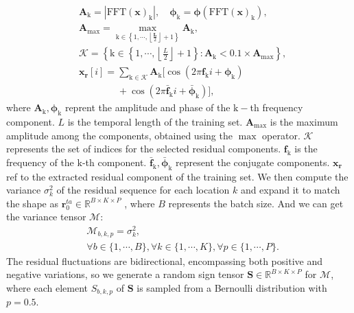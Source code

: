 \begin{equation}
    \begin{aligned}
    & \mathbf{A}_{\mathrm{k}} = \left| \text{FFT}(\mathbf{x})_\mathrm{k} \right|, \quad \mathbf{{\phi}}_{\mathrm{k}} = \mathbf{\phi} \left( \text{FFT}(\mathbf{x})_\mathrm{k} \right), \\
    & \mathbf{A}_{\text{max}}=\max_{\mathrm{k}\in\left\{1,\cdots,\left\lfloor\frac{\mathbf{L}}{2}\right\rfloor + 1\right\}}\mathbf{A}_{\mathrm{k}}, \\
    & \mathcal{K} = \left\{ \mathrm{k} \in \left\{ 1, \cdots, \left\lfloor \frac{{L}}{2} \right\rfloor + 1 \right\} : \mathbf{A}_{\mathrm{k}} < 0.1 \times \mathbf{A}_{\text{max}} \right\}, \\
    & \mathbf{x}_{\mathbf{r}}[i] = \sum_{\mathrm{k} \in \mathcal{K}} \mathbf{A}_{\mathrm{k}} \Big[ \cos \left( 2\pi \mathbf{f}_{\mathrm{k}} i + \mathbf{\phi}_{\mathrm{k}} \right) \\
    & \qquad \qquad + \cos \left( 2\pi \bar{\mathbf{f}}_{\mathrm{k}} i + \bar{\mathbf{\phi}}_{\mathrm{k}} \right) \Big],
    \end{aligned}
\end{equation}
where \(\mathbf{A}_{\mathrm{k}},\mathbf{\phi}_{\mathrm{k}}\) reprent the amplitude and phase of the $\mathrm{k}-$th frequency component. $L$ is the temporal length of the training set. \(\mathbf{A}_{\text{max}}\) is the maximum amplitude among the components, obtained using the $\max$ operator. $\mathcal{K}$ represents the set of indices for the selected residual components. \(\mathbf{f}_{\mathrm{k}}\) is the frequency of the \(\mathrm{k}\)-th component. $\bar{\mathbf{f}}_{\mathrm{k}}, \bar{\mathbf{\phi}}_{\mathrm{k}}$ represent the conjugate components. \(\mathbf{x}_{\mathbf{r}}\) ref to the extracted residual component of the training set. We then compute the variance $\sigma^2_k$ of the residual sequence for each location $k$ and expand it to match the shape as 
\(\mathbf{r}^{ta}_0 \in \mathbb{R}^{B \times K \times P}\) , where $B$ represents the batch size. And we can get the variance tensor \(\mathcal{M}\): 
\begin{equation}
\begin{aligned}
    &\mathcal{M}_{b,k,p}=\sigma_{k}^2,\\
&\forall b\in\{1,\cdots,B\}, \forall k\in\{1,\cdots,K\}, \forall p\in\{1,\cdots,P\}.
\end{aligned}
\end{equation}
The residual fluctuations are bidirectional, encompassing both positive and negative variations, so we generate a random sign tensor \(\mathbf{S}\in\mathbb{R}^{B\times K\times P}\) for \(\mathcal{M}\), where each element \(S_{b,k,p}\) of \(\mathbf{S}\) is sampled from a Bernoulli distribution with \(p = 0.5\). 

